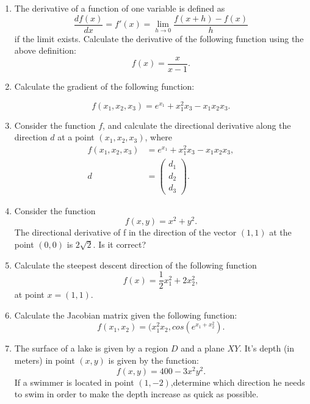 \begin{enumerate}

\item The derivative of a function of one variable is defined as
  \[
\frac{df(x)}{dx}=f'(x) = \lim_{h \to 0}\frac{f(x+h)-f(x)}{h}
\]
if the limit exists. Calculate the derivative of the following
function using the above definition:
\[
f(x)= \frac{x}{x-1}.
\]
\item Calculate the gradient of the following function:

 \[f(x_1,x_2,x_3)= e^{x_1} + x_1^2x_3 -x_1x_2x_3.\]

\item Consider the function $f$, and calculate
the directional derivative along the direction $d$ at a point $(x_1,
x_2, x_3)$, where
\begin{align}
f(x_1,x_2,x_3)&=  e^{x_1} + x_1^2x_3 -x_1x_2x_3,\\
  d
&=
\begin{pmatrix}
    d_1 \\
    d_2 \\
    d_3
\end{pmatrix}.
\end{align}

\item
 Consider the function $$f(x,y)=x^2 +y^2.$$ The directional derivative
 of f in the direction of the vector $(1,1)$ at the point $(0,0)$ is
 $2\sqrt{2}$. Is it correct? 

\item Calculate the steepest descent direction of the
  following function
  \[
  f(x)=  \frac{1}{2}x_1^2+2x_2^2,
  \]
  at point $x= (1,1)$.

\item  Calculate the Jacobian matrix given the following function:
\[
f(x_1,x_2)= (x_1^2x_2, cos(e^{x_1+x_2^2}).
\]


\item The surface of a lake is given by a region $D$ and a
plane $XY$. It's depth (in meters) in point $(x,y)$ is given by the function: $$f(x,y)=400-3x^2y^2.$$ If a swimmer is located in point $(1,-2)$,determine which direction he needs to swim in order to make the depth increase as quick as possible.

\end{enumerate}

